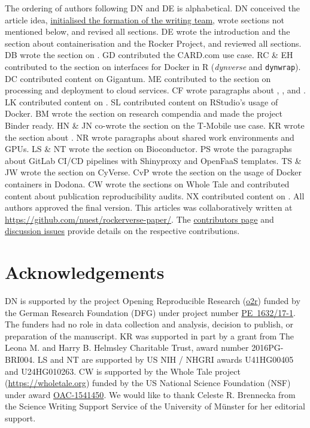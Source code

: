 The ordering of authors following DN and DE is alphabetical. DN
conceived the article idea,
\href{https://github.com/nuest/rockerverse-paper/issues/3}{initialised the formation of the writing team},
wrote sections not mentioned below, and revised all sections. DE wrote
the introduction and the section about containerisation and the Rocker
Project, and reviewed all sections. DB wrote the section on
. GD contributed the CARD.com use case. RC \& EH
contributed to the section on interfaces for Docker in R
(\emph{dynverse} and \texttt{dynwrap}). DC contributed content on
Gigantum. ME contributed to the section on processing and deployment to
cloud services. CF wrote paragraphs about ,
,  and . LK contributed content on
. SL contributed content on RStudio's usage of Docker. BM
wrote the section on research compendia and made the project Binder
ready. HN \& JN co-wrote the section on the T-Mobile use case. KR wrote
the section about . NR wrote paragraphs about shared work
environments and GPUs. LS \& NT wrote the section on Bioconductor. PS
wrote the paragraphs about GitLab CI/CD pipelines with Shinyproxy and
OpenFaaS templates. TS \& JW wrote the section on CyVerse. CvP wrote the
section on the usage of Docker containers in Dodona. CW wrote the
sections on Whole Tale and contributed content about publication
reproducibility audits. NX contributed content on . All
authors approved the final version. This articles was collaboratively
written at
\href{https://github.com/nuest/rockerverse-paper/}{https://github.com/nuest/rockerverse-paper/}.
The
\href{https://github.com/nuest/rockerverse-paper/graphs/contributors}{contributors page}
and
\href{https://github.com/nuest/rockerverse-paper/issues/}{discussion issues}
provide details on the respective contributions.

\hypertarget{acknowledgements}{%
\section{Acknowledgements}\label{acknowledgements}}

DN is supported by the project Opening Reproducible Research
(\href{https://www.uni-muenster.de/forschungaz/project/12343}{o2r})
funded by the German Research Foundation (DFG) under project number
\href{https://gepris.dfg.de/gepris/projekt/415851837}{PE~1632/17-1}. The
funders had no role in data collection and analysis, decision to
publish, or preparation of the manuscript. KR was supported in part by a
grant from The Leona M. and Harry B. Helmsley Charitable Trust, award
number 2016PG-BRI004. LS and NT are supported by US NIH / NHGRI awards
U41HG00405 and U24HG010263. CW is supported by the Whole Tale project
(\url{https://wholetale.org}) funded by the US National Science
Foundation (NSF) under award
\href{https://www.nsf.gov/awardsearch/showAward?AWD_ID=1541450}{OAC-1541450}.
We would like to thank Celeste R. Brennecka from the Science Writing
Support Service of the University of Münster for her editorial support.

